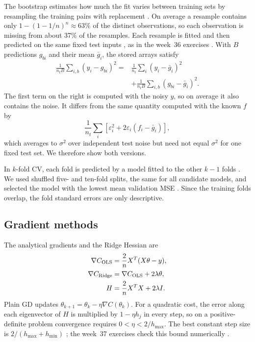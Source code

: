 \documentclass[aps,prb,reprint,superscriptaddress,nofootinbib,longbibliography,floatfix]{revtex4-2}
\begin{document}
The bootstrap estimates how much the fit varies between training sets by resampling the training pairs with replacement \cite{Efron1979}. On average a resample contains only $1-(1-1/n)^n\approx63\%$ of the distinct observations, so each observation is missing from about 37\% of the resamples. Each resample is fitted and then predicted on the same fixed test inputs \cite[Secs.~2.10 and 2.11]{HjorthJensen2026}, as in the week~36 exercises \cite{Exercises36}. With $B$ predictions $g_{bi}$ and their mean $\bar g_i$, the stored arrays satisfy
\begin{align}
\frac1{n_t B}\sum_{i,b}(y_i-g_{bi})^2
={}&\frac1{n_t}\sum_i(y_i-\bar g_i)^2\nonumber\\
&+\frac1{n_t B}\sum_{i,b}(g_{bi}-\bar g_i)^2.
\end{align}
The first term on the right is computed with the noisy $y$, so on average it also contains the noise. It differs from the same quantity computed with the known $f$ by
\[
\frac1{n_t}\sum_i\left[\varepsilon_i^2+2\varepsilon_i(f_i-\bar g_i)\right],
\]
which averages to $\sigma^2$ over independent test noise but need not equal $\sigma^2$ for one fixed test set. We therefore show both versions.

In $k$-fold CV, each fold is predicted by a model fitted to the other $k-1$ folds \cite[Sec.~7.10]{Hastie2009}. We used shuffled five- and ten-fold splits, the same for all candidate models, and selected the model with the lowest mean validation MSE \cite[Secs.~2.12 and 3.14]{HjorthJensen2026}. Since the training folds overlap, the fold standard errors are only descriptive.

\subsection{Gradient methods}\label{sec:gd_theory}
The analytical gradients and the Ridge Hessian are
\begin{align}
\nabla C_{\rm OLS}&=\frac2nX^T(X\theta-y),\nonumber\\
\nabla C_{\rm Ridge}&=\nabla C_{\rm OLS}+2\lambda\theta,\nonumber\\
H&=\frac2nX^TX+2\lambda I.
\end{align}
Plain GD updates $\theta_{k+1}=\theta_k-\eta\nabla C(\theta_k)$. For a quadratic cost, the error along each eigenvector of $H$ is multiplied by $1-\eta h_j$ in every step, so on a positive-definite problem convergence requires $0<\eta<2/h_{\max}$. The best constant step size is $2/(h_{\max}+h_{\min})$ \cite[Secs.~4.3--4.5]{HjorthJensen2026}; the week~37 exercises check this bound numerically \cite{Exercises37}.
\end{document}
